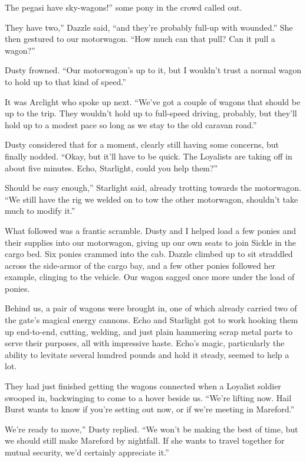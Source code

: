 \leavevmode{}The pegasi have sky-wagons!” some pony in the crowd called out.

\leavevmode{}They have two,” Dazzle said, “and they’re probably full-up with wounded.” She then gestured to our motorwagon. “How much can that pull? Can it pull a wagon?”

Dusty frowned. “Our motorwagon’s up to it, but I wouldn’t trust a normal wagon to hold up to that kind of speed.”

It was Arclight who spoke up next. “We’ve got a couple of wagons that should be up to the trip. They wouldn’t hold up to full-speed driving, probably, but they’ll hold up to a modest pace so long as we stay to the old caravan road.”

Dusty considered that for a moment, clearly still having some concerns, but finally nodded. “Okay, but it’ll have to be quick. The Loyalists are taking off in about five minutes. Echo, Starlight, could you help them?”

\leavevmode{}Should be easy enough,” Starlight said, already trotting towards the motorwagon. “We still have the rig we welded on to tow the other motorwagon, shouldn’t take much to modify it.”

What followed was a frantic scramble. Dusty and I helped load a few ponies and their supplies into our motorwagon, giving up our own seats to join Sickle in the cargo bed. Six ponies crammed into the cab. Dazzle climbed up to sit straddled across the side-armor of the cargo bay, and a few other ponies followed her example, clinging to the vehicle. Our wagon sagged once more under the load of ponies.

Behind us, a pair of wagons were brought in, one of which already carried two of the gate’s magical energy cannons. Echo and Starlight got to work hooking them up end-to-end, cutting, welding, and just plain hammering scrap metal parts to serve their purposes, all with impressive haste. Echo’s magic, particularly the ability to levitate several hundred pounds and hold it steady, seemed to help a lot.

They had just finished getting the wagons connected when a Loyalist soldier swooped in, backwinging to come to a hover beside us. “We’re lifting now. Hail Burst wants to know if you’re setting out now, or if we’re meeting in Mareford.”

\leavevmode{}We’re ready to move,” Dusty replied. “We won’t be making the best of time, but we should still make Mareford by nightfall. If she wants to travel together for mutual security, we’d certainly appreciate it.”

